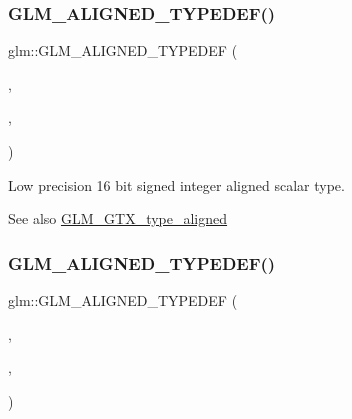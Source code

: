\subsubsection{\texorpdfstring{G\+L\+M\+\_\+\+A\+L\+I\+G\+N\+E\+D\+\_\+\+T\+Y\+P\+E\+D\+E\+F()}{GLM\_ALIGNED\_TYPEDEF()}\hspace{0.1cm}{\footnotesize\ttfamily [10/209]}}
{\footnotesize\ttfamily glm\+::\+G\+L\+M\+\_\+\+A\+L\+I\+G\+N\+E\+D\+\_\+\+T\+Y\+P\+E\+D\+EF (\begin{DoxyParamCaption}\item[{\hyperlink{group__gtc__type__precision_gaf7bbfd31bcec25a416ea94d09efb5451}{lowp\+\_\+i16}}]{,  }\item[{aligned\+\_\+lowp\+\_\+i16}]{,  }\item[{2}]{ }\end{DoxyParamCaption})}

Low precision 16 bit signed integer aligned scalar type. \begin{DoxySeeAlso}{See also}
\hyperlink{group__gtx__type__aligned}{G\+L\+M\+\_\+\+G\+T\+X\+\_\+type\+\_\+aligned} 
\end{DoxySeeAlso}
\mbox{\label{group__gtx__type__aligned_gaa07e98e67b7a3435c0746018c7a2a839}} 
\subsubsection{\texorpdfstring{G\+L\+M\+\_\+\+A\+L\+I\+G\+N\+E\+D\+\_\+\+T\+Y\+P\+E\+D\+E\+F()}{GLM\_ALIGNED\_TYPEDEF()}\hspace{0.1cm}{\footnotesize\ttfamily [11/209]}}
{\footnotesize\ttfamily glm\+::\+G\+L\+M\+\_\+\+A\+L\+I\+G\+N\+E\+D\+\_\+\+T\+Y\+P\+E\+D\+EF (\begin{DoxyParamCaption}\item[{\hyperlink{group__gtc__type__precision_ga70fd34e8b8cffc92739161284ed77328}{lowp\+\_\+i32}}]{,  }\item[{aligned\+\_\+lowp\+\_\+i32}]{,  }\item[{4}]{ }\end{DoxyParamCaption})}

